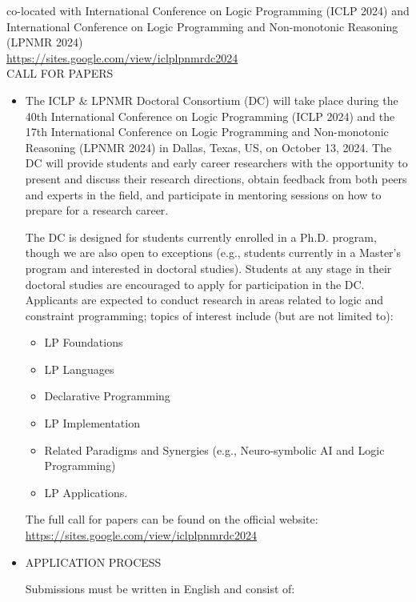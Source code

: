 \documentclass[prodmode,acmtecs]{acmsmall} %
\begin{document}
  co-located with International Conference on Logic Programming (ICLP 2024) and International Conference on Logic Programming and Non-monotonic Reasoning (LPNMR 2024)\\ 
  \href{https://sites.google.com/view/iclplpnmrdc2024}{https://sites.google.com/view/iclplpnmrdc2024}\\ 
CALL FOR PAPERS 

\begin{itemize}\item  The ICLP \& LPNMR Doctoral Consortium (DC) will take place during the 40th International Conference on Logic Programming (ICLP 2024) and the 17th International Conference on Logic Programming and Non-monotonic Reasoning (LPNMR 2024) in Dallas, Texas, US, on October 13, 2024. The DC will provide students and early career researchers with the opportunity to present and discuss their research directions, obtain feedback from both peers and experts in the field, and participate in mentoring sessions on how to prepare for a research career.  
 
  The DC is designed for students currently enrolled in a Ph.D. program, though we are also open to exceptions (e.g., students currently in a Master's program and interested in doctoral studies). Students at any stage in their doctoral studies are encouraged to apply for participation in the DC. Applicants are expected to conduct research in areas related to logic and constraint programming; topics of interest include (but are not limited to): 
 
\begin{itemize}\item  LP Foundations
\item  LP Languages
\item  Declarative Programming
\item  LP Implementation
\item  Related Paradigms and Synergies (e.g., Neuro-symbolic AI and Logic Programming)
\item  LP Applications.
\end{itemize} 
  The full call for papers can be found on the official website: \href{https://sites.google.com/view/iclplpnmrdc2024}{https://sites.google.com/view/iclplpnmrdc2024} 
 
\item  APPLICATION PROCESS 
 
  Submissions must be written in English and consist of: 
 

\end{itemize}
\end{document}
